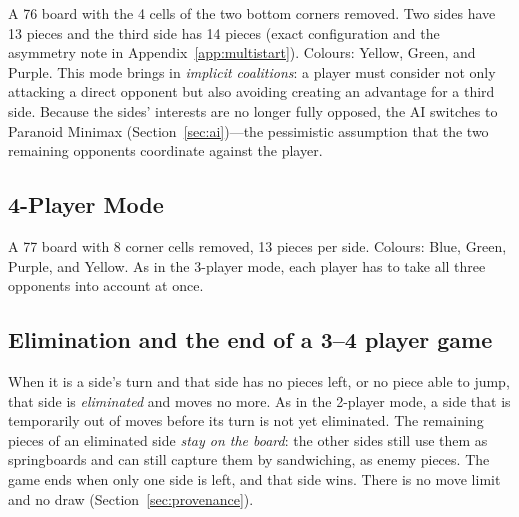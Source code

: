A 7{\texttimes}6 board with the 4 cells of the two bottom corners removed. Two sides have
13 pieces and the third side has 14 pieces (exact configuration and the
asymmetry note in Appendix~\ref{app:multistart}). Colours: Yellow, Green,
and Purple. This mode brings in \emph{implicit coalitions}: a player must
consider not only attacking a direct opponent but also avoiding creating an
advantage for a third side. Because the sides' interests are no longer
fully opposed, the AI switches to Paranoid Minimax
(Section~\ref{sec:ai})---the pessimistic assumption that the two remaining
opponents coordinate against the player.

\subsection{4-Player Mode}
A 7{\texttimes}7 board with 8 corner cells removed, 13 pieces per side.
Colours: Blue, Green, Purple, and Yellow. As in the 3-player mode, each
player has to take all three opponents into account at once.

\subsection{Elimination and the end of a 3--4 player game}
\label{ssec:elimination}

When it is a side's turn and that side has no pieces left, or no piece able
to jump, that side is \emph{eliminated} and moves no more. As in the
2-player mode, a side that is temporarily out of moves before its turn is not
yet eliminated. The remaining pieces of an eliminated side \emph{stay on the
board}: the other sides still use them as springboards and can still capture
them by sandwiching, as enemy pieces. The game ends when only one side is
left, and that side wins. There is no move limit and no draw
(Section~\ref{sec:provenance}).
